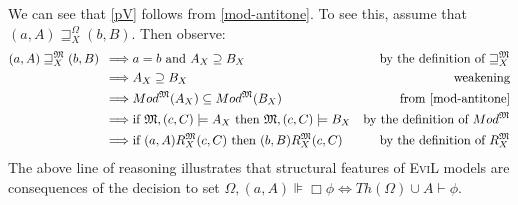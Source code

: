 We can see that \ref{pV} follows from \eqref{mod-antitone}. 
To see this, assume that $(a, A) \sqsupseteq_X^{\Omega} (b, B)$.  Then observe:
\begin{align*}
(a, A) \sqsupseteq_X^{\Omega} (b, B) & \ \implies a = b \textup{ and } A_X
\supseteq B_X & \textup{by the definition of $\sqsupseteq_X^{\Omega}$} \\
& \ \implies A_X \supseteq B_X & \textup{weakening} \\
& \ \implies Mod^{\Omega}(A_X) \subseteq Mod^{\Omega}(B_X) &
\textup{from \eqref{mod-antitone}} \\
& \ \implies \textup{if } \Omega,(c,C)\models A_X\textup{ then }
\Omega,(c,C)\models B_X &
\textup{by the definition of $Mod^{\Omega}$} \\
& \ \implies \textup{if } (a, A) R^{\Omega}_X (c,C)\textup{ then }
(b, B) R^{\Omega}_X (c,C)  &
\textup{by the definition of $R_X^\Omega$} \\
\end{align*}
The above line of reasoning illustrates that structural 
features of \textsc{EviL} models are consequences of
the decision to set $\Omega,(a,A) \VDash \Box \phi \iff Th(\Omega)
\cup A \vdash \phi$.


